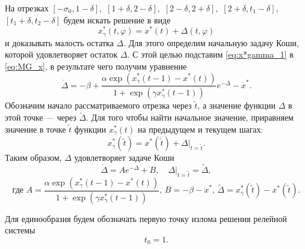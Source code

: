 На отрезках 
$[-\sigma_0, 1 - \delta],$ 
$[1 + \delta, 2 - \delta],$ 
$[2 - \delta, 2 + \delta],$ 
$[2 + \delta, t_1 - \delta],$ 
$[t_1 + \delta, t_2 - \delta]$ 
будем искать решение в виде
%
\begin{equation}
    \label{eq:x*gamma_1}
    x^*_\gamma(t, \varphi) = x^*(t) + \Delta(t, \varphi)
\end{equation}
%
и доказывать малость остатка $\Delta$. Для этого определим начальную задачу Коши, которой удовлетворяет остаток $\Delta$. С этой целью подставим \eqref{eq:x*gamma_1} в \eqref{eq:MG_x}, в результате чего получим уравнение
%
\begin{equation*}
    \dot{\Delta} = -\beta + \frac{\alpha\exp(x_{\gamma}^*(t - 1) - x^*(t))}{1 + \exp(\gamma x_{\gamma}^*(t - 1))}e^{-\Delta}-\dot{x}^*.
\end{equation*}
%
Обозначим начало рассматриваемого отрезка через $\tilde{t}$, а значение функции $\Delta$ в этой точке --- через $\tilde{\Delta}$. Для того чтобы найти начальное значение, приравняем значение в точке $\tilde{t}$ функции $x_{\gamma}^*(t)$ на предыдущем и текущем шагах:
%
\[x_{\gamma}^*(\tilde{t}) = x^*(\tilde{t}) + \Delta|_{t=\tilde{t}}.\]
%
Таким образом, $\Delta$ удовлетворяет задаче Коши
\begin{equation}
        \label{eq:task_DeltaAB}
        \dot{\Delta}=A e^{-\Delta} + B,\quad \Delta|_{t=\tilde{t}}=\tilde{\Delta},
\end{equation}
%
\begin{equation}
    \label{AB_eq:x*gamma_1}
\text{где } A = \frac{\alpha\exp(x_{\gamma}^*(t - 1) - x^*(t))}{1+\exp(\gamma x_{\gamma}^*(t - 1))},\, 
B = -\beta-\dot{x}^*,\, 
\tilde{\Delta}=x_{\gamma}^*(\tilde{t}) - x^*(\tilde{t}).
\end{equation}

Для единообразия будем обозначать первую точку излома решения релейной системы
\begin{equation}
	\label{eq:t0:ch1}
	t_0 = 1.
\end{equation}

